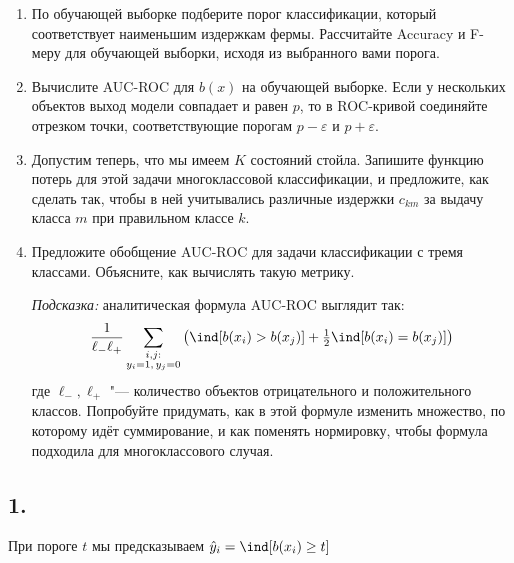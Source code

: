 \documentclass[12pt,a4paper]{article}
\begin{document}
\begin{enumerate}
    \item По обучающей выборке подберите порог классификации, который
    соответствует наименьшим издержкам фермы. Рассчитайте Accuracy и
    F-меру для обучающей выборки, исходя из выбранного вами порога.

    \item Вычислите AUC-ROC для $b(x)$ на обучающей выборке. Если у
    нескольких объектов выход модели совпадает и равен $p$, то в
    ROC-кривой соединяйте отрезком точки, соответствующие порогам
    $p - \varepsilon$ и $p + \varepsilon$.

    \item Допустим теперь, что мы имеем $K$ состояний стойла. Запишите
    функцию потерь для этой задачи многоклассовой классификации, и
    предложите, как сделать так, чтобы в ней учитывались различные
    издержки $c_{km}$ за выдачу класса $m$ при правильном классе $k$.

    \item Предложите обобщение AUC-ROC для задачи классификации с тремя
    классами. Объясните, как вычислять такую метрику.

    \emph{Подсказка:} аналитическая формула AUC-ROC выглядит так:
    \[
    \frac{1}{\ell_-\ell_+}\sum_{\substack{i,j:\\y_i=1,\,y_j=0}}
    \left(\ind[b(x_i) > b(x_j)] +
    \tfrac{1}{2}\ind[b(x_i) = b(x_j)]\right)
    \]
    где $\ell_-, \ell_+$ "--- количество объектов отрицательного и
    положительного классов. Попробуйте придумать, как в этой формуле
    изменить множество, по которому идёт суммирование, и как поменять
    нормировку, чтобы формула подходила для многоклассового случая.
\end{enumerate}

\subsection*{1.}

При пороге $t$ мы предсказываем $\hat{y}_i = \ind[b(x_i) \ge t]$
\end{document}

